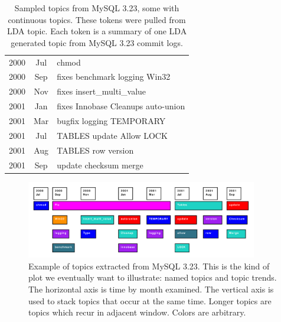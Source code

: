 \documentclass[times, 10pt,twocolumn]{article}
\begin{document}
\begin{table}
\centering
\begin{tabular}{|cc|l|}
\hline
2000 &  Jul &      chmod \\
2000 &  Sep &      fixes benchmark logging Win32 \\
2000 &  Nov &      fixes insert\_multi\_value \\
2001 &  Jan &      fixes Innobase Cleanups auto-union \\
2001 &  Mar &      bugfix logging  TEMPORARY  \\
\hline         
2001 &  Jul &      TABLES update Allow LOCK \\ 
               
2001 &  Aug &      TABLES row version \\
\hline         
2001 &  Sep &      update checksum merge \\
\hline
\end{tabular}
\caption{Sampled topics from MySQL 3.23, some with continuous topics. These tokens were pulled from LDA topic. Each token is a summary of one LDA generated topic from MySQL 3.23 commit logs.}
\label{tab:portability}
\end{table}



\begin{figure}[t]
  \centering
  \includegraphics[width=0.9\textwidth]{lda}
  \caption{Example of topics extracted from MySQL 3.23. This is the
    kind of plot we eventually want to illustrate: named topics and
    topic trends. The horizontal axis is time by month examined. The
    vertical axis is used to stack topics that occur at the same
    time. Longer topics are topics which recur in adjacent
    window. Colors are arbitrary.}
  \label{fig:lda}
\end{figure}
\end{document}
